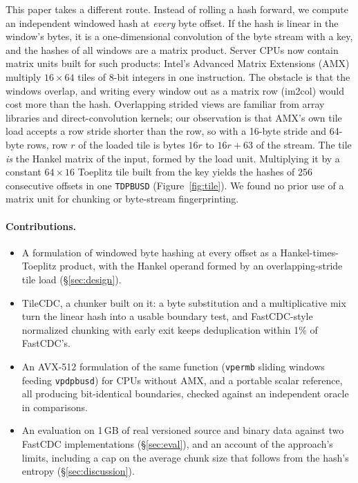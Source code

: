 \documentclass[10pt,twocolumn]{article}
\begin{document}
This paper takes a different route. Instead of rolling a hash forward, we compute an independent windowed hash at \emph{every} byte offset. If the hash is linear in the window's bytes, it is a one-dimensional convolution of the byte stream with a key, and the hashes of all windows are a matrix product. Server CPUs now contain matrix units built for such products: Intel's Advanced Matrix Extensions (AMX) multiply $16\times64$ tiles of 8-bit integers in one instruction. The obstacle is that the windows overlap, and writing every window out as a matrix row (im2col) would cost more than the hash. Overlapping strided views are familiar from array libraries and direct-convolution kernels; our observation is that AMX's own tile load accepts a row stride shorter than the row, so with a 16-byte stride and 64-byte rows, row $r$ of the loaded tile is bytes $16r$ to $16r+63$ of the stream. The tile \emph{is} the Hankel matrix of the input, formed by the load unit. Multiplying it by a constant $64\times16$ Toeplitz tile built from the key yields the hashes of 256 consecutive offsets in one \texttt{TDPBUSD} (Figure~\ref{fig:tile}). We found no prior use of a matrix unit for chunking or byte-stream fingerprinting.

\paragraph{Contributions.}
\begin{itemize}\setlength\itemsep{1pt}
\item A formulation of windowed byte hashing at every offset as a Hankel-times-Toeplitz product, with the Hankel operand formed by an overlapping-stride tile load (\S\ref{sec:design}).
\item TileCDC, a chunker built on it: a byte substitution and a multiplicative mix turn the linear hash into a usable boundary test, and FastCDC-style normalized chunking with early exit keeps deduplication within 1\% of FastCDC's.
\item An AVX-512 formulation of the same function (\texttt{vpermb} sliding windows feeding \texttt{vpdpbusd}) for CPUs without AMX, and a portable scalar reference, all producing bit-identical boundaries, checked against an independent oracle in \testComparisons{} comparisons.
\item An evaluation on 1\,GB of real versioned source and binary data against two FastCDC implementations (\S\ref{sec:eval}), and an account of the approach's limits, including a cap on the average chunk size that follows from the hash's entropy (\S\ref{sec:discussion}).
\end{itemize}
\end{document}
